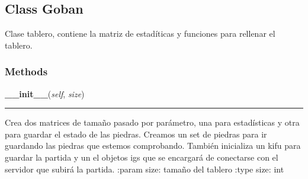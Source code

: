 
\subsection{Class Goban}

    \label{src:goban:Goban}

Clase tablero, contiene la matriz de estadíticas y funciones para
rellenar el tablero.


  \subsubsection{Methods}

    \label{src:goban:Goban:__init__}

    \vspace{0.5ex}

\hspace{.8\funcindent}\begin{boxedminipage}{\funcwidth}

    \raggedright \textbf{\_\_init\_\_}(\textit{self}, \textit{size})

    \vspace{-1.5ex}

    \rule{\textwidth}{0.5\fboxrule}
\setlength{\parskip}{2ex}

Crea dos matrices de tamaño pasado por parámetro, una para
estadísticas y otra para guardar el estado de las piedras. Creamos un
set de piedras para ir guardando las piedras que estemos comprobando.
También inicializa un kifu para guardar la partida y un el objetos igs
que se encargará de conectarse con el servidor que subirá la partida.
:param size: tamaño del tablero
:type size: int
\setlength{\parskip}{1ex}
    \end{boxedminipage}

